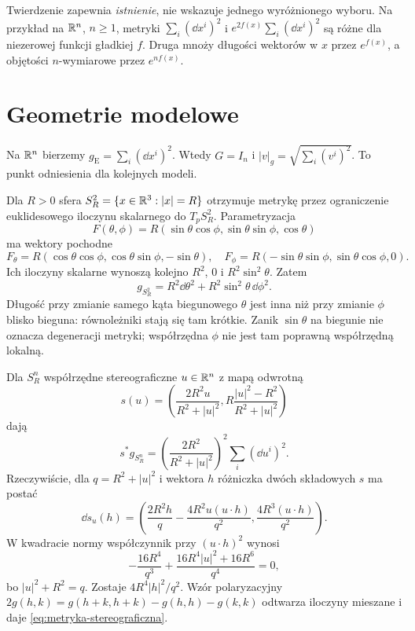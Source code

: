 Twierdzenie zapewnia \emph{istnienie}, nie wskazuje
jednego wyróżnionego wyboru. Na przykład na $\mathbb{R}^n$, $n\geq1$,
metryki $\sum_i(\dd x^i)^2$ i
$e^{2f(x)}\sum_i(\dd x^i)^2$ są różne dla
niezerowej funkcji gładkiej $f$. Druga mnoży
długości wektorów w $x$ przez $e^{f(x)}$,
a objętości $n$-wymiarowe przez $e^{nf(x)}$.


\section{Geometrie modelowe}
\label{sec:metryki-modelowe}

\begin{przyklad}
Na $\mathbb{R}^n$ bierzemy $g_{\mathrm E}=\sum_i(\dd x^i)^2$.
Wtedy $G=I_n$ i $|v|_g=\sqrt{\sum_i(v^i)^2}$.
To punkt odniesienia dla kolejnych modeli.
\end{przyklad}

\begin{przyklad}[Sfera]
\label{prz:metryka-sfery}
Dla $R>0$ sfera $S_R^2=\{x\in\mathbb{R}^3:|x|=R\}$ otrzymuje
metrykę przez ograniczenie euklidesowego iloczynu
skalarnego do $T_pS_R^2$. Parametryzacja
\[
 F(\theta,\phi)
 =R(\sin\theta\cos\phi,\sin\theta\sin\phi,\cos\theta)
\]
ma wektory pochodne
\[
 F_\theta
 =R(\cos\theta\cos\phi,\cos\theta\sin\phi,-\sin\theta),
 \quad
 F_\phi
 =R(-\sin\theta\sin\phi,\sin\theta\cos\phi,0).
\]
Ich iloczyny skalarne wynoszą kolejno
$R^2$, $0$ i $R^2\sin^2\theta$. Zatem
\begin{equation}\label{eq:metryka-sfery}
 g_{S_R^2}=R^2\dd\theta^2
       +R^2\sin^2\theta\,\dd\phi^2.
\end{equation}
Długość przy zmianie samego kąta biegunowego
$\theta$ jest inna niż przy zmianie $\phi$ blisko
bieguna: równoleżniki stają się tam krótkie.
Zanik $\sin\theta$ na biegunie nie oznacza
degeneracji metryki; współrzędna $\phi$ nie jest
tam poprawną współrzędną lokalną.

Dla $S_R^n$ współrzędne stereograficzne $u\in\mathbb{R}^n$
z mapą odwrotną
\[
 s(u)=\left(\frac{2R^2u}{R^2+|u|^2},
            R\frac{|u|^2-R^2}{R^2+|u|^2}\right)
\]
dają
\begin{equation}\label{eq:metryka-stereograficzna}
 s^*g_{S_R^n}
 =\left(\frac{2R^2}{R^2+|u|^2}\right)^2
   \sum_i(\dd u^i)^2.
\end{equation}
Rzeczywiście, dla $q=R^2+|u|^2$ i wektora $h$
różniczka dwóch składowych $s$ ma postać
\[
 \dd s_u(h)=
 \left(\frac{2R^2h}{q}
       -\frac{4R^2u(u\cdot h)}{q^2},
       \frac{4R^3(u\cdot h)}{q^2}\right).
\]
W kwadracie normy współczynnik przy $(u\cdot h)^2$ wynosi
\[
 -\frac{16R^4}{q^3}
 +\frac{16R^4|u|^2+16R^6}{q^4}=0,
\]
bo $|u|^2+R^2=q$. Zostaje $4R^4|h|^2/q^2$.
Wzór polaryzacyjny
$2g(h,k)=g(h+k,h+k)-g(h,h)-g(k,k)$
odtwarza iloczyny mieszane i daje
\eqref{eq:metryka-stereograficzna}.
\end{przyklad}

